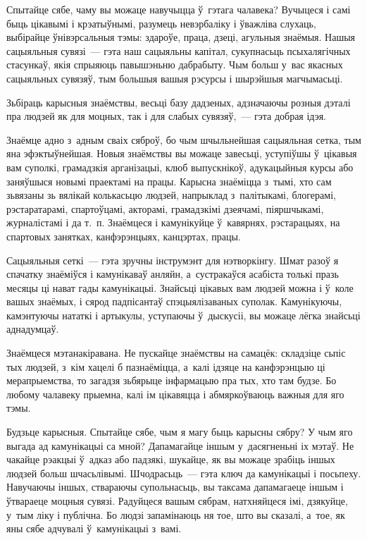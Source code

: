 Спытайце сябе, чаму вы можаце навучыцца ў~гэтага чалавека? Вучыцеся і самі быць цікавымі і крэатыўнымі, разумець невэрбаліку і ўважліва слухаць, выбірайце ўнівэрсальныя тэмы: здароўе, праца, дзеці, агульныя знаёмыя. Нашыя сацыяльныя сувязі~--- гэта наш сацыяльны капітал, сукупнасьць псыхалягічных стасункаў, якія спрыяюць павышэньню дабрабыту. Чым больш у~вас якасных сацыяльных сувязяў, тым большыя вашыя рэсурсы і шырэйшыя магчымасьці.

Зьбіраць карысныя знаёмствы, весьці базу дадзеных, адзначаючы розныя дэталі пра людзей як для моцных, так і для слабых сувязяў,~--- гэта добрая ідэя.

Знаёмце адно з~адным сваіх сяброў, бо чым шчыльнейшая сацыяльная сетка, тым яна эфэктыўнейшая. Новыя знаёмствы вы можаце завесьці, уступіўшы ў~цікавыя вам суполкі, грамадзкія арганізацыі, клюб выпускнікоў, адукацыйныя курсы або заняўшыся новымі праектамі на працы. Карысна знаёміцца з~тымі, хто сам зьвязаны зь вялікай колькасьцю людзей, напрыклад з~палітыкамі, блогерамі, рэстаратарамі, спартоўцамі, акторамі, грамадзкімі дзеячамі, піяршчыкамі, журналістамі і да т.~п. Знаёмцеся і камунікуйце ў~кавярнях, рэстарацыях, на спартовых занятках, канфэрэнцыях, канцэртах, працы.

Сацыяльныя сеткі~--- гэта зручны інструмэнт для нэтворкінгу. Шмат разоў я спачатку знаёміўся і камунікаваў анляйн, а~сустракаўся асабіста толькі празь месяцы ці нават гады камунікацыі. Знайсьці цікавых вам людзей можна і ў~коле вашых знаёмых, і сярод падпісантаў спэцыялізаваных суполак. Камунікуючы, камэнтуючы нататкі і артыкулы, уступаючы ў~дыскусіі, вы можаце лёгка знайсьці аднадумцаў.

Знаёмцеся мэтанакіравана. Не пускайце знаёмствы на самацёк: складзіце сьпіс тых людзей, з~кім хацелі б пазнаёміцца, а~калі ідзяце на канфэрэнцыю ці мерапрыемства, то загадзя зьбярыце інфармацыю пра тых, хто там будзе. Бо любому чалавеку прыемна, калі ім цікавяцца і абмяркоўваюць важныя для яго тэмы.

Будзьце карысныя. Спытайце сябе, чым я магу быць карысны сябру? У чым яго выгада ад камунікацыі са мной? Дапамагайце іншым у~дасягненьні іх мэтаў. Не чакайце рэакцыі ў~адказ або падзякі, шукайце, як вы можаце зрабіць іншых людзей больш шчасьлівымі. Шчодрасьць~--- гэта ключ да камунікацыі і посьпеху. Навучаючы іншых, ствараючы супольнасьць, вы таксама дапамагаеце іншым і ўтвараеце моцныя сувязі. Радуйцеся вашым сябрам, натхняйцеся імі, дзякуйце, у~тым ліку і публічна. Бо людзі запамінаюць ня тое, што вы сказалі, а~тое, як яны сябе адчувалі ў~камунікацыі з~вамі.

